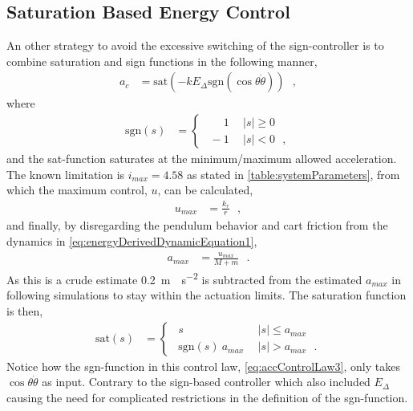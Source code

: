 \subsection{Saturation Based Energy Control}
An other strategy to avoid the excessive switching of the sign-controller is to combine saturation and sign functions in the following manner,
\begin{align}
  a_c &= \mathrm{sat}(-k E_\Delta \mathrm{sgn}(\cos \theta \dot{\theta}))  \ \ \ ,   \label{eq:accControlLaw3} 
\end{align}
where 
\begin{align}
\mathrm{sgn}( s ) &=
\begin{cases}
\ \ \phantom{-}1 & \ \  | s |  \geq 0 \\
\ \           -1 & \ \  | s |  <    0 \ \ \ ,
\end{cases}
\label{eq:sgnFunction1}
\end{align}
and the sat-function saturates at the minimum/maximum allowed acceleration. The known limitation is $i_{max} = 4.58$ as stated in \autoref{table:systemParameters}, from which the maximum control, $u$, can be calculated,
\begin{align}
  u_{max} &=  \frac{k_{\tau}}{r} \ \ \ ,    \label{eq:maxU} 
\end{align}
and finally, by disregarding the pendulum behavior and cart friction from the dynamics in \autoref{eq:energyDerivedDynamicEquation1},
\begin{align}
  a_{max} &= \frac{u_{max}}{M+m} \ \ \ .   \label{eq:maxAcc} 
\end{align}
As this is a crude estimate \SI{0.2}{m\cdot s^{-2}} is subtracted from the estimated $a_{max}$ in following simulations to stay within the actuation limits. The saturation function is then,
\begin{align}
  \text{sat}(s) &=
  \begin{cases}
    \ \ s                           & \ \  | s |  \leq a_{max} \\
    \ \ \mathrm{sgn}( s )\ a_{max}  & \ \  | s |  >  a_{max} \ \ \ .
  \end{cases}
  \label{eq:satuationFunction}
\end{align}
Notice how the sgn-function in this control law, \autoref{eq:accControlLaw3}, only takes $\cos \theta \dot{\theta}$ as input. Contrary to the sign-based controller which also included $E_\Delta$ causing the need for complicated restrictions in the definition of the sgn-function.

